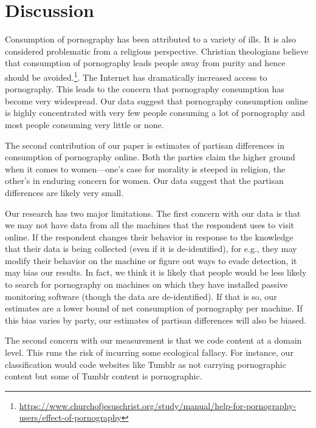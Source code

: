 \documentclass[12pt, letterpaper]{article}
\begin{document}
\section*{Discussion}

Consumption of pornography has been attributed to a variety of ills. It is also considered problematic from a religious perspective. Christian theologians believe that consumption of pornography leads people away from purity and hence should be avoided.\footnote{\url{https://www.churchofjesuschrist.org/study/manual/help-for-pornography-users/effect-of-pornography}}. The Internet has dramatically increased access to pornography. This leads to the concern that pornography consumption has become very widespread. Our data suggest that pornography consumption online is highly concentrated with very few people consuming a lot of pornography and most people consuming very little or none.


The second contribution of our paper is estimates of partisan differences in consumption of pornography online. Both the parties claim the higher ground when it comes to women---one's case for morality is steeped in religion, the other's in enduring concern for women. Our data suggest that the partisan differences are likely very small.

Our research has two major limitations. The first concern with our data is that we may not have data from all the machines that the respondent uses to visit online. If the respondent changes their behavior in response to the knowledge that their data is being collected (even if it is de-identified), for e.g., they may modify their behavior on the machine or figure out ways to evade detection, it may bias our results. In fact, we think it is likely that people would be less likely to search for pornography on machines on which they have installed passive monitoring software (though the data are de-identified). If that is so, our estimates are a lower bound of net consumption of pornography per machine. If this bias varies by party, our estimates of partisan differences will also be biased. 

The second concern with our measurement is that we code content at a domain level. This runs the risk of incurring some ecological fallacy. For instance, our classification would code websites like Tumblr as not carrying pornographic content but some of Tumblr content is pornographic. 

\clearpage


\clearpage
\end{document}
